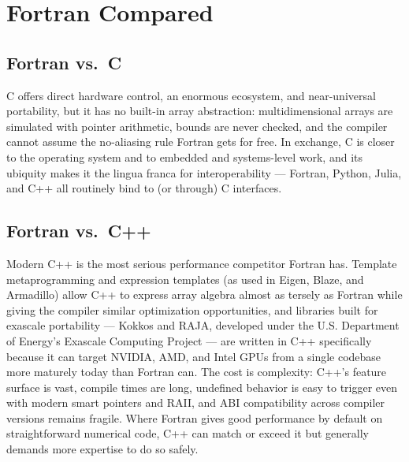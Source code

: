 \section{Fortran Compared}

\subsection{Fortran vs.\ C}

C offers direct hardware control, an enormous ecosystem, and near-universal portability, but it has no built-in array abstraction: multidimensional arrays are simulated with pointer arithmetic, bounds are never checked, and the compiler cannot assume the no-aliasing rule Fortran gets for free. In exchange, C is closer to the operating system and to embedded and systems-level work, and its ubiquity makes it the lingua franca for interoperability --- Fortran, Python, Julia, and C++ all routinely bind to (or through) C interfaces.

\subsection{Fortran vs.\ C++}

Modern C++ is the most serious performance competitor Fortran has. Template metaprogramming and expression templates (as used in Eigen, Blaze, and Armadillo) allow C++ to express array algebra almost as tersely as Fortran while giving the compiler similar optimization opportunities, and libraries built for exascale portability --- Kokkos and RAJA, developed under the U.S. Department of Energy's Exascale Computing Project --- are written in C++ specifically because it can target NVIDIA, AMD, and Intel GPUs from a single codebase more maturely today than Fortran can. The cost is complexity: C++'s feature surface is vast, compile times are long, undefined behavior is easy to trigger even with modern smart pointers and RAII, and ABI compatibility across compiler versions remains fragile. Where Fortran gives good performance by default on straightforward numerical code, C++ can match or exceed it but generally demands more expertise to do so safely.

